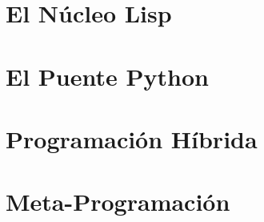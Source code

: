 \documentclass{lispy-book}
\begin{document}
\part{El Núcleo Lisp}
\label{part:nuclisp}











\part{El Puente Python}
\label{part:puentepy}











\part{Programación Híbrida}
\label{part:hibrida}














\part{Meta-Programación}
\label{part:metaprog}
\end{document}
